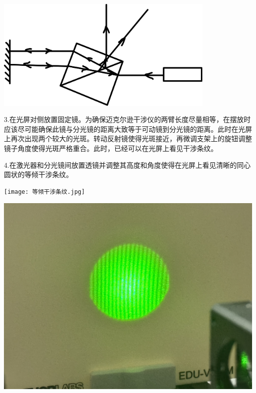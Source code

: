 \documentclass[10pt]{ctexart}
\begin{document}
\begin{minipage}{\textwidth} 
    \includegraphics[width=0.8\textwidth]{两个光斑的解释.jpg}
\end{minipage}

3.在光屏对侧放置固定镜。为确保迈克尔逊干涉仪的两臂长度尽量相等，在摆放时应该尽可能确保此镜与分光镜的距离大致等于可动镜到分光镜的距离。此时在光屏上再次出现两个较大的光斑。转动反射镜使得光斑接近，再微调支架上的旋钮调整镜子角度使得光斑严格重合。此时，已经可以在光屏上看见干涉条纹。

4.在激光器和分光镜间放置透镜并调整其高度和角度使得在光屏上看见清晰的同心圆状的等倾干涉条纹。

\begin{minipage}{0.45\textwidth}
    \texttt{[image: 等倾干涉条纹.jpg]}
\end{minipage}
\hfill
\begin{minipage}{0.45\textwidth}
    \includegraphics[width=\textwidth]{等厚干涉条纹.jpg}
\end{minipage}
\end{document}
